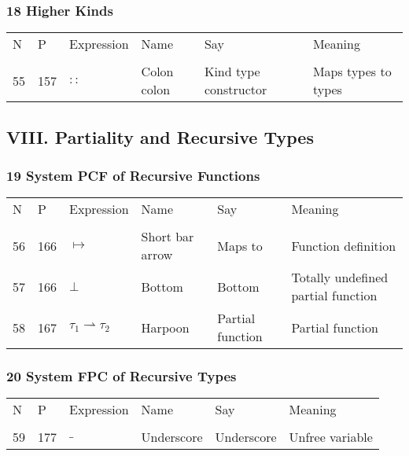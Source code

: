 \documentclass[12pt]{article}
\begin{document}
\subsubsection*{18 Higher Kinds}
\begin{tabular}[b] {p{} p{} p{} p{} 
p{} p{}}
N & P & Expression & Name & Say & Meaning \\ \\


55& 157 & $::$ & Colon colon & Kind type constructor & Maps types to types \\
\end{tabular}
\subsection*{VIII. Partiality and Recursive Types}
\subsubsection*{19 System PCF of Recursive Functions}
\begin{tabular}[b] {p{} p{} p{} p{} 
p{} p{}}
N & P & Expression & Name & Say & Meaning \\ \\

56& 166 & $\mapsto$ & Short bar arrow & Maps to & Function definition \\
57& 166 &$ \bot$ & Bottom & Bottom & Totally undefined partial function \\
58& 167 & $\tau_1 \rightharpoonup \tau_2$ & Harpoon & Partial function & Partial function \\
\end{tabular}

\subsubsection*{20 System FPC of Recursive Types}
\begin{tabular}[b] {p{} p{} p{} p{} 
p{} p{}}
N & P & Expression & Name & Say & Meaning \\ \\


59& 177 & $\_$ & Underscore & Underscore & Unfree variable \\
\end{tabular}
\end{document}
